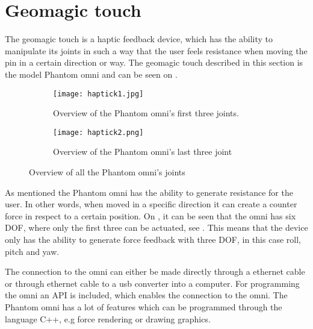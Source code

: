 \section{Geomagic touch}\label{sec:geo_magic}
The geomagic touch is a haptic feedback device, which has the ability to manipulate its joints in such a way that the user feels resistance when moving the pin in a certain direction or way. The geomagic touch described in this section is the model Phantom omni and can be seen on .

\begin{figure}[H]
	\centering
	\begin{subfigure}{.45\textwidth}
		\centering
		\texttt{[image: haptick1.jpg]}
		\caption{Overview of the Phantom omni's first three joints.}
		\label{fig:phantom1}
	\end{subfigure}
	\begin{subfigure}{.45\textwidth}
		\centering
		\texttt{[image: haptick2.png]}
		\caption{Overview of the Phantom omni's last three joint}
		\label{fig:phantom2}
	\end{subfigure}
\caption{Overview of all the Phantom omni's joints\cite{phantom_omni}}
\label{fig:phantom_omni}
\end{figure}

As mentioned the Phantom omni has the ability to generate resistance for the user. In other words, when moved in a specific direction it can create a counter force in respect to a certain position. On , it can be seen that the omni has six \gls{DOF}, where only the first three can be actuated, see . This means that the device only has the ability to generate force feedback with three \gls{DOF}, in this case roll, pitch and yaw.

The connection to the omni can either be made directly through a ethernet cable or through ethernet cable to a usb converter into a computer. For programming the omni an API is included, which enables the connection to the omni. The Phantom omni has a lot of features which can be programmed through the language C++, e.g force rendering or drawing graphics.
